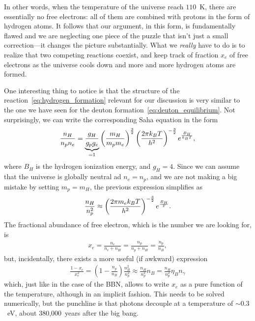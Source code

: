 In other words, when the temperature of the universe reach $110$~K, there are essentially
no free electrons: all of them are combined with protons in the form of hydrogen
atoms. It follows that our argument, in this form, is fundamentally flawed and we
are neglecting one piece of the puzzle that isn't just a small correction---it changes
the picture substantially.
What we \emph{really} have to do is to realize that two competing reactions coexist,
and keep track of fraction $x_e$ of free electrons as the universe cools down and
more and more hydrogen atoms are formed.

One interesting thing to notice is that the structure of the reaction~\eqref{eq:hydrogen_formation}
relevant for our discussion is very similar to the one we have seen for the deuton
formation~\eqref{eq:deuton_equilibrium}. Not surprisingly, we can write the corresponding
Saha equation in the form
\begin{align}
  \frac{n_H}{n_p n_e} =
  \underbrace{\frac{g_H}{g_p g_e}}_{=1} \left(\frac{m_H}{m_p m_e} \right)^\frac{3}{2}
  \left( \frac{2\pi k_B T}{h^2} \right)^{-\frac{3}{2}} e^{\frac{B_H}{k_B T}},
\end{align}
where $B_H$ is the hydrogen ionization energy, and $g_H = 4$. Since we can assume
that the universe is globally neutral ad $n_e = n_p$, and we are not making a big
mistake by setting $m_p = m_H$, the previous expression simplifies as
\begin{align*}
  \frac{n_H}{n_p^2} \approx
  \left( \frac{2\pi m_e k_B T}{h^2} \right)^{-\frac{3}{2}} e^\frac{B_H}{T}.
\end{align*}
The fractional abundance of free electron, which is the number we are looking for,
is
\begin{align*}
  x_e = \frac{n_e}{n_e + n_H} = \frac{n_p}{n_p + n_H} = \frac{n_p}{n_B},
\end{align*}
but, incidentally, there exists a more useful (if awkward) expression
\begin{align}
  \frac{1 - x_e}{x_e^2}  =
  \left( 1 - \frac{n_p}{n_B} \right) \frac{n_B^2}{n_p^2} \approx
  \frac{n_H}{n_p^2} n_B =
  \frac{n_H}{n_p^2} \eta_B n_\gamma
\end{align}
which, just like in the case of the BBN, allows to write $x_e$ as a pure function
of the temperature, although in an implicit fashion. This needs to be solved numerically,
but the punchline is that photons decouple at a temperature of $\sim 0.3$~eV, about 380,000~years
after the big bang.



